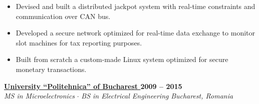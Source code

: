 \documentclass[11pt]{res}
\begin{document}
\begin{resume}
\begin{rightrule}
    \begin{itemize}[noitemsep]
    \item Devised and built a distributed jackpot system with real-time constraints and communication over CAN bus.
    \item Developed a secure network optimized for real-time data exchange to monitor slot machines for tax reporting purposes.
    \item Built from scratch a custom-made Linux system optimized for secure monetary transactions.
    \end{itemize}
\end{rightrule}
\vspace{-6mm}
\textbf{\Large \href{http://www.upb.ro/}{University ``Politehnica'' of Bucharest \scriptsize {}}}
\hfill \textbf{2009 -- 2015} \hspace{3mm} \\
\textit{MS in Microelectronics} \enskip $\cdot$ \enskip \textit{BS in Electrical Engineering} \hfill \textit{Bucharest, Romania }

 



\end{resume}
\end{document}
